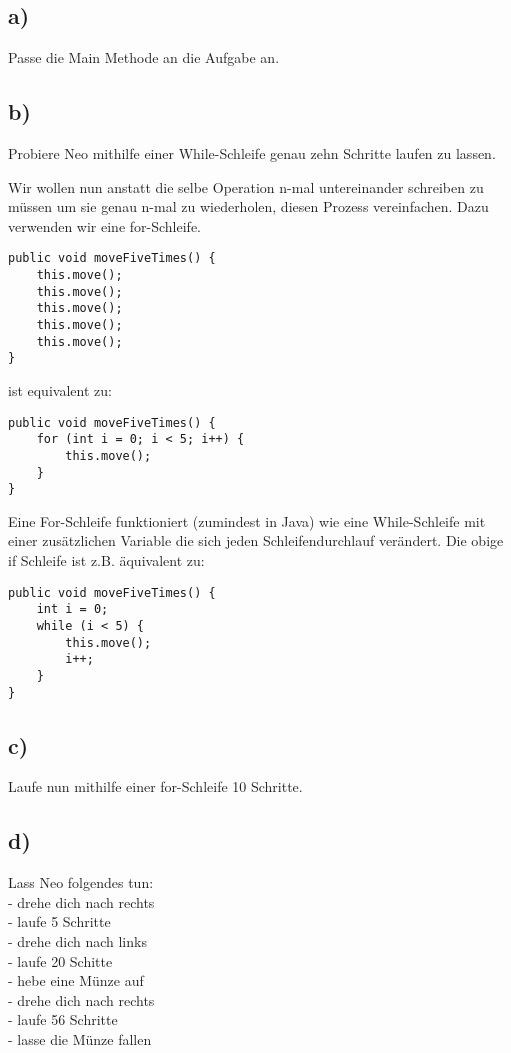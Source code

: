 \subsection*{a)}
	Passe die Main Methode an die Aufgabe an.
\subsection*{b)}

	Probiere Neo mithilfe einer While-Schleife genau zehn Schritte laufen zu lassen.

\begin{Infobox}
		Wir wollen nun anstatt die selbe Operation n-mal untereinander schreiben zu müssen um sie genau n-mal zu wiederholen, diesen Prozess vereinfachen.
		Dazu verwenden wir eine for-Schleife. 
		\begin{lstlisting}
public void moveFiveTimes() {
	this.move();
	this.move();
	this.move();
	this.move();
	this.move();
}
		\end{lstlisting}
		ist equivalent zu:
		\begin{lstlisting}
public void moveFiveTimes() {
	for (int i = 0; i < 5; i++) {
		this.move();
	}
}
		\end{lstlisting}
Eine For-Schleife funktioniert (zumindest in Java) wie eine While-Schleife mit einer zusätzlichen Variable die sich jeden Schleifendurchlauf verändert.
Die obige if Schleife ist z.B. äquivalent zu:
		\begin{lstlisting}
public void moveFiveTimes() {
	int i = 0;
	while (i < 5) {
		this.move();
		i++;
	}
}
		\end{lstlisting}
 \end{Infobox}

\subsection*{c)}
Laufe nun mithilfe einer for-Schleife 10 Schritte.

\subsection*{d)}
Lass Neo folgendes tun:\\
	- drehe dich nach rechts\\
	- laufe 5 Schritte\\
	- drehe dich nach links\\ 
	- laufe 20 Schitte\\
	- hebe eine Münze auf\\
	- drehe dich nach rechts\\
	- laufe 56 Schritte\\
	- lasse die Münze fallen

